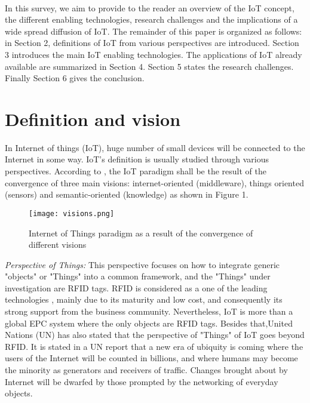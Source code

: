 \documentclass[10pt, twocolumn]{article}
\begin{document}
\paragraph{}
In this survey, we aim to provide to the reader an overview of the IoT concept, the different enabling technologies, research challenges and the implications of a wide spread diffusion of IoT.
The remainder of this paper is organized as follows: in Section 2, definitions of IoT from various perspectives are introduced. Section 3 introduces the main IoT enabling technologies. The applications of IoT already available are summarized in Section 4. Section 5 states the research challenges. Finally Section 6 gives the conclusion.
\section{Definition and vision}
In Internet of things (IoT), huge number of small devices will be connected to the Internet in some way. IoT's definition is usually studied through various perspectives. According to \cite{ref3}, the IoT paradigm shall be the result of the convergence of three main visions: internet-oriented (middleware), things oriented (sensors) and semantic-oriented (knowledge) as shown in Figure 1.
\begin{figure}
\begin{center}
\texttt{[image: visions.png]}
\end{center}
\caption{Internet of Things paradigm as a result of the convergence of different visions}
\end{figure}
\emph{Perspective of Things: } This perspective focuses on how to integrate generic "objects" or "Things" into a common framework, and the "Things" under investigation are RFID tags. RFID is considered as a one of the leading technologies \cite{ref6}, mainly due to its maturity and low cost, and consequently its strong support from the business community. Nevertheless, IoT is more than a global EPC system where the only objects are RFID tags. Besides that,United Nations (UN) has also stated that the perspective of "Things" of IoT goes beyond RFID. It is stated in a UN report that a new era of ubiquity is coming where the users of the Internet will be counted in billions, and where humans may become the minority as generators and receivers of traffic. Changes brought about by Internet will be dwarfed by those prompted by the networking of everyday objects.
\end{document}
